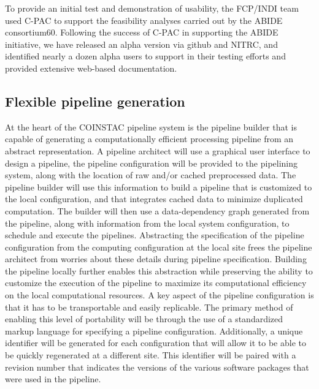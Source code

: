 To provide an initial test and demonstration of usability, the FCP/INDI team used C-PAC to support the feasibility analyses carried out by the ABIDE consortium60. Following the success of C-PAC in supporting the ABIDE initiative, we have released an alpha version via github and NITRC, and identified nearly a dozen alpha users to support in their testing efforts and provided extensive web-based documentation.

\subsection{Flexible pipeline generation}
At the heart of the COINSTAC pipeline system is the pipeline builder that is capable of generating a computationally efficient processing pipeline from an abstract representation. A pipeline architect will use a graphical user interface to design a pipeline, the pipeline configuration will be provided to the pipelining system, along with the location of raw and/or cached preprocessed data. The pipeline builder will use this information to build a pipeline that is customized to the local configuration, and that integrates cached data to minimize duplicated computation. The builder will then use a data-dependency graph generated from the pipeline, along with information from the local system configuration, to schedule and execute the pipelines. Abstracting the specification of the pipeline configuration from the computing configuration at the local site frees the pipeline architect from worries about these details during pipeline specification. Building the pipeline locally further enables this abstraction while preserving the ability to customize the execution of the pipeline to maximize its computational efficiency on the local computational resources. A key aspect of the pipeline configuration is that it has to be transportable and easily replicable. The primary method of enabling this level of portability will be through the use of a standardized markup language for specifying a pipeline configuration. Additionally, a unique identifier will be generated for each configuration that will allow it to be able to be quickly regenerated at a different site. This identifier will be paired with a revision number that indicates the versions of the various software packages that were used in the pipeline. 

